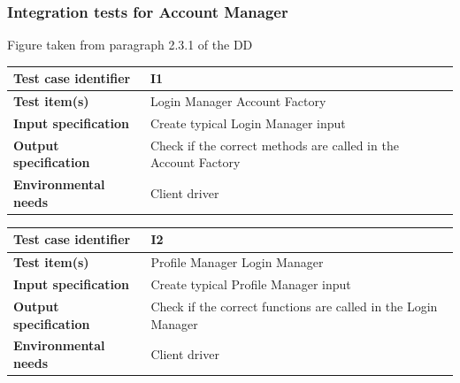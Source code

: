 \documentclass[a4paper,11pt]{report} %
\begin{document}
		\subsubsection{Integration tests for Account Manager} \label{sec:3.1.1}
		\begin{minipage}{\linewidth}
		\end{minipage}
		\begin{center}
			Figure taken from paragraph 2.3.1 of the DD
		\end{center} 
		\begin{center}
			\renewcommand{\arraystretch}{1.2}
			\setlength{\tabcolsep}{24pt}
			\begin{tabular}{ l  p{9cm}}\hline
				\textbf{Test case identifier} & I1\\\hline
				\textbf{Test item(s)} & Login Manager \textrightarrow Account Factory\\\hline
				\textbf{Input specification} & Create typical Login Manager input \\\hline
				\textbf{Output specification} & Check if the correct methods are called in the Account Factory\\\hline
				\textbf{Environmental needs} & Client driver\\\hline
			\end{tabular}
		\end{center}	
		\bigskip	
		\begin{center}
			\renewcommand{\arraystretch}{1.2}
			\setlength{\tabcolsep}{24pt}
			\begin{tabular}{ l  p{9cm}}\hline
				\textbf{Test case identifier} & I2\\\hline
				\textbf{Test item(s)} & Profile Manager \textrightarrow Login Manager\\\hline
				\textbf{Input specification} & Create typical Profile Manager input \\\hline
				\textbf{Output specification} & Check if the correct functions are called in the Login Manager\\\hline
				\textbf{Environmental needs} & Client driver\\\hline
			\end{tabular}
		\end{center}
				
\end{document}
